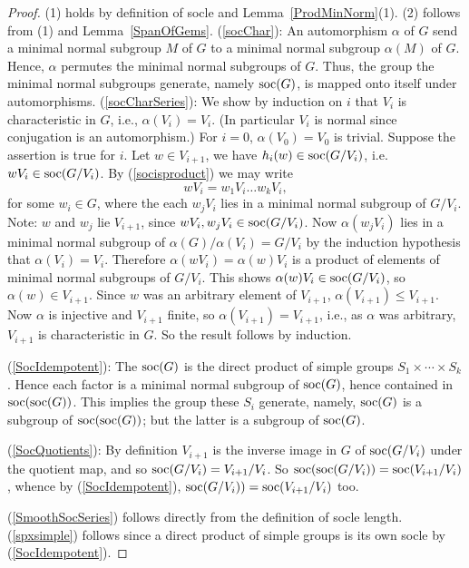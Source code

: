 \documentclass[a4paper,11pt]{amsart}
\theoremstyle{definition}
\newcommand{\soc}{\mbox{\rm soc}}
\newcommand{\1}{{\mathbf 1}}
\begin{document}
\begin{proof}
(1) holds by definition of socle and  Lemma~\ref{ProdMinNorm}(1). (2) follows from (1) and Lemma~\ref{SpanOfGems}.
(\ref{socChar}):  An automorphism $\alpha$ of $G$ send a minimal normal subgroup $M$ of $G$ to a minimal normal subgroup $\alpha(M)$ of $G$. Hence, $\alpha$ permutes the minimal normal subgroups of $G$. Thus, the group the minimal normal subgroups generate, namely $\soc(G)$, is mapped onto itself under automorphisms.  (\ref{socCharSeries}):  
  We show by induction on $i$ that $V_i$ is characteristic in $G$, i.e., $\alpha(V_i)=V_i$.  (In particular $V_i$ is normal since conjugation is an automorphism.)   
For $i=0$, $\alpha(V_0)=V_0$ is trivial.  Suppose the assertion is true for $i$.   Let $w\in V_{i+1}$, we have $h_i(w)\in \soc(G/V_i)$, i.e. $wV_i \in \soc(G/V_i)$. By (\ref{socisproduct}) we may write 
$$ w V_i = w_1 V_i \ldots w_k V_i, $$
for some $w_i\in G$, where the  each $w_j V_i$ lies in a minimal normal subgroup of
$G/V_i$.  Note: $w$ and $w_j$ lie $V_{i+1}$, since $w V_i, w_j V_i \in \soc(G/V_i)$.
Now $\alpha(w_j V_i)$ lies in a minimal normal subgroup of $\alpha(G)/\alpha(V_i)= G/V_i$ by the
induction hypothesis that $\alpha(V_i)=V_i$. Therefore
$\alpha(wV_i)=\alpha(w)V_i$ is a product of elements of minimal normal subgroups of $G/V_i$. 
This shows $\alpha(w)V_i \in \soc(G/V_i)$, so $\alpha(w) \in V_{i+1}$. 
Since $w$ was an arbitrary element of $V_{i+1}$, $\alpha(V_{i+1})\leq V_{i+1}$. Now $\alpha$ is injective and
 $V_{i+1}$ finite, so $\alpha(V_{i+1})=V_{i+1}$, i.e., as $\alpha$ was arbitrary, $V_{i+1}$ is characteristic in  $G$.   So the result follows by induction.
 

 
(\ref{SocIdempotent}):
The $\soc(G)$ is the direct product of simple groups $S_1\times \cdots \times S_k$.  Hence each factor is a minimal normal subgroup of $\soc(G)$, hence contained in $\soc(\soc(G))$. This implies the group these $S_i$ generate, namely, $\soc(G)$ is a subgroup of $\soc(\soc(G))$; but the latter is a subgroup of $\soc(G)$. 

 
(\ref{SocQuotients}): By definition $V_{i+1}$ is the inverse image in $G$ of $\soc(G/V_{i})$ under the quotient map,  and so $\soc(G/V_{i})=V_{i+1}/V_i$. So $\soc(\soc(G/V_{i}))=\soc(V_{i+1}/V_i)$, whence by 
(\ref{SocIdempotent}), $\soc(G/V_i)) = \soc(V_{i+1}/V_i)$ too. 
 



(\ref{SmoothSocSeries}) follows directly from the definition of socle length. \\
(\ref{spxsimple}) follows since a direct product of simple groups is its own socle by (\ref{SocIdempotent}).
\end{proof}
 
\end{document}
